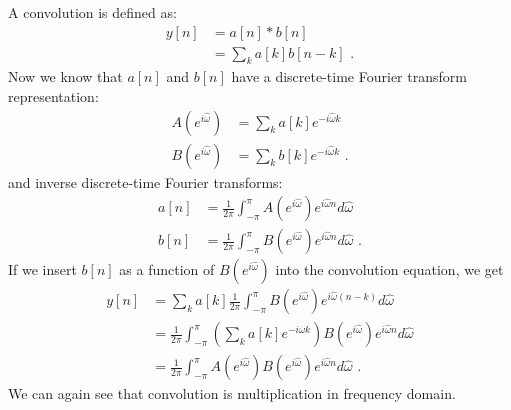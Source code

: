 A convolution is defined as:
\begin{align}
    y[n] &= a[n] * b[n]\\
    &= \sum_k a[k] b[n-k]\,\,.
\end{align}
Now we know that $a[n]$ and $b[n]$ have a discrete-time Fourier transform representation:
\begin{align}
    A(e^{i\hat{\omega}}) &= \sum_k a[k] e^{-i\hat{\omega}k}\\
    B(e^{i\hat{\omega}}) &= \sum_k b[k] e^{-i\hat{\omega}k}\,\,.
\end{align}
and inverse discrete-time Fourier transforms:
\begin{align}
    a[n] &= \frac{1}{2\pi}\int_{-\pi}^{\pi}A(e^{i\hat{\omega}})e^{i\hat{\omega}n}d\hat{\omega}\\
    b[n] &= \frac{1}{2\pi}\int_{-\pi}^{\pi}B(e^{i\hat{\omega}})e^{i\hat{\omega}n}d\hat{\omega}\,\,.
\end{align}
If we insert $b[n]$ as a function of $B(e^{i\hat{\omega}})$ into the convolution equation, we get
\begin{align}
    y[n] &= \sum_k a[k]\frac{1}{2\pi}\int_{-\pi}^{\pi}B(e^{i\hat{\omega}})e^{i\hat{\omega}(n-k)}d\hat{\omega}\\
     &= \frac{1}{2\pi}\int_{-\pi}^{\pi}\left(\sum_k a[k] e^{-i\hat{\omega}k} \right)B(e^{i\hat{\omega}})e^{i\hat{\omega}n}d\hat{\omega}\\
 &= \frac{1}{2\pi}\int_{-\pi}^{\pi}A(e^{i\hat{\omega}})B(e^{i\hat{\omega}})e^{i\hat{\omega}n}d\hat{\omega}\,\,.
\end{align}
We can again see that convolution is multiplication in frequency domain.
\fi 


